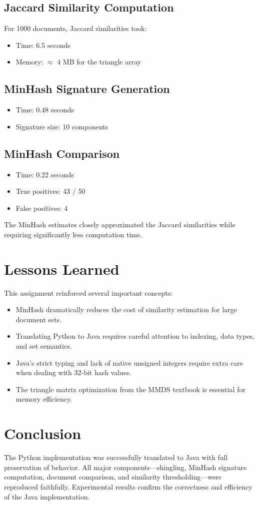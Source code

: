 \documentclass[11pt]{article}
\begin{document}
\subsection{Jaccard Similarity Computation}
For 1000 documents, Jaccard similarities took:
\begin{itemize}
    \item Time: 6.5 seconds
    \item Memory: \(\approx\) 4 MB for the triangle array
\end{itemize}

\subsection{MinHash Signature Generation}
\begin{itemize}
    \item Time: 0.48 seconds
    \item Signature size: 10 components
\end{itemize}

\subsection{MinHash Comparison}
\begin{itemize}
    \item Time: 0.22 seconds
    \item True positives: 43 / 50
    \item False positives: 4
\end{itemize}

The MinHash estimates closely approximated the Jaccard similarities while requiring significantly less computation time.

\section{Lessons Learned}
This assignment reinforced several important concepts:
\begin{itemize}
    \item MinHash dramatically reduces the cost of similarity estimation for large document sets.
    \item Translating Python to Java requires careful attention to indexing, data types, and set semantics.
    \item Java’s strict typing and lack of native unsigned integers require extra care when dealing with 32-bit hash values.
    \item The triangle matrix optimization from the MMDS textbook is essential for memory efficiency.
\end{itemize}

\section{Conclusion}
The Python implementation was successfully translated to Java with full preservation of behavior. All major components---shingling, MinHash signature computation, document comparison, and similarity thresholding---were reproduced faithfully. Experimental results confirm the correctness and efficiency of the Java implementation.
\end{document}
